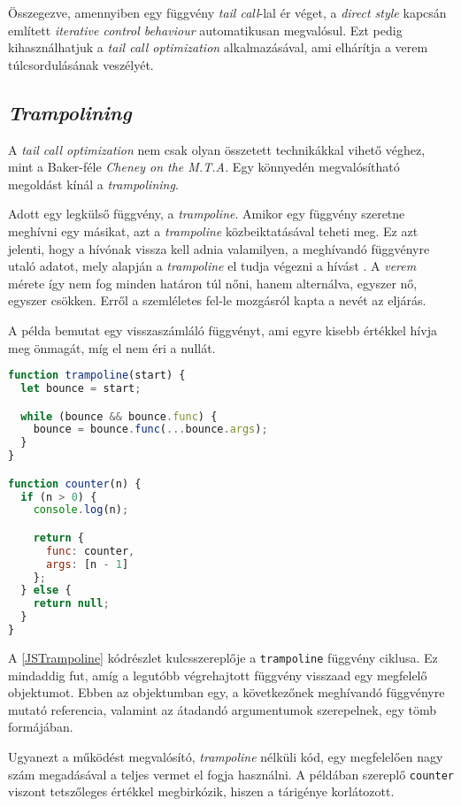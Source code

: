 Összegezve, amennyiben egy függvény \textit{tail call}-lal ér véget, a \textit{direct style} kapcsán említett \textit{iterative control behaviour} automatikusan megvalósul. Ezt pedig kihasználhatjuk a \textit{tail call optimization} alkalmazásával, ami elhárítja a verem túlcsordulásának veszélyét.

\subsection{\textit{Trampolining}}

 A \textit{tail call optimization} nem csak olyan összetett technikákkal vihető véghez, mint a Baker-féle \textit{Cheney on the M.T.A.} Egy könnyedén megvalósítható megoldást kínál a \textit{trampolining}.

 Adott egy legkülső függvény, a \textit{trampoline}. Amikor egy függvény szeretne meghívni egy másikat, azt a \textit{trampoline} közbeiktatásával teheti meg. Ez azt jelenti, hogy a hívónak vissza kell adnia valamilyen, a meghívandó függvényre utaló adatot, mely alapján a \textit{trampoline} el tudja végezni a hívást \cite{Schinz2001}. A \textit{verem} mérete így nem fog minden határon túl nőni, hanem alternálva, egyszer nő, egyszer csökken. Erről a szemléletes fel-le mozgásról kapta a nevét az eljárás.

 A példa bemutat egy visszaszámláló függvényt, ami egyre kisebb értékkel hívja meg önmagát, míg el nem éri a nullát.

\begin{lstlisting}[language=JavaScript, caption={\textit{Trampolining} megvalósítása \textit{JavaScript}ben}, captionpos=b, label=JSTrampoline]
function trampoline(start) {
  let bounce = start;

  while (bounce && bounce.func) {
    bounce = bounce.func(...bounce.args);
  }
}

function counter(n) {
  if (n > 0) {
    console.log(n);

    return { 
      func: counter, 
      args: [n - 1]
    };
  } else {
    return null;
  }
}
\end{lstlisting}
 
 A \ref{JSTrampoline} kódrészlet kulcsszereplője a \texttt{trampoline} függvény ciklusa. Ez mindaddig fut, amíg a legutóbb végrehajtott függvény visszaad egy megfelelő objektumot. Ebben az objektumban egy, a következőnek meghívandó függvényre mutató referencia, valamint az átadandó argumentumok szerepelnek, egy tömb formájában.

 Ugyanezt a működést megvalósító, \textit{trampoline} nélküli kód, egy megfelelően nagy szám megadásával a teljes vermet el fogja használni. A példában szereplő \texttt{counter} viszont tetszőleges értékkel megbirkózik, hiszen a tárigénye korlátozott.